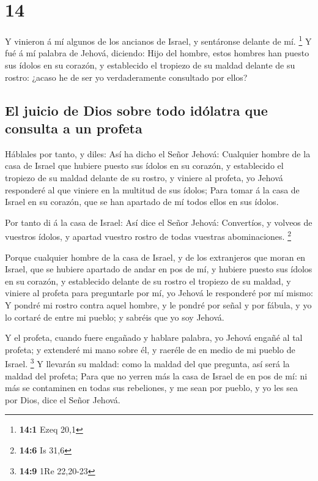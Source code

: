 \hypertarget{section-13}{%
\section{14}\label{section-13}}

 Y vinieron á mí algunos de los ancianos de Israel, y
sentáronse delante de mí. \footnote{\textbf{14:1} Ezeq 20,1}
 Y fué á mí palabra de Jehová, diciendo:  Hijo
del hombre, estos hombres han puesto sus ídolos en su corazón, y
establecido el tropiezo de su maldad delante de su rostro: ¿acaso he de
ser yo verdaderamente consultado por ellos?

\hypertarget{el-juicio-de-dios-sobre-todo-iduxf3latra-que-consulta-a-un-profeta}{%
\subsection{El juicio de Dios sobre todo idólatra que consulta a un
profeta}\label{el-juicio-de-dios-sobre-todo-iduxf3latra-que-consulta-a-un-profeta}}

 Háblales por tanto, y diles: Así ha dicho el Señor Jehová:
Cualquier hombre de la casa de Israel que hubiere puesto sus ídolos en
su corazón, y establecido el tropiezo de su maldad delante de su rostro,
y viniere al profeta, yo Jehová responderé al que viniere en la multitud
de sus ídolos;  Para tomar á la casa de Israel en su
corazón, que se han apartado de mí todos ellos en sus ídolos.

 Por tanto di á la casa de Israel: Así dice el Señor Jehová:
Convertíos, y volveos de vuestros ídolos, y apartad vuestro rostro de
todas vuestras abominaciones. \footnote{\textbf{14:6} Is 31,6}

 Porque cualquier hombre de la casa de Israel, y de los
extranjeros que moran en Israel, que se hubiere apartado de andar en pos
de mí, y hubiere puesto sus ídolos en su corazón, y establecido delante
de su rostro el tropiezo de su maldad, y viniere al profeta para
preguntarle por mí, yo Jehová le responderé por mí mismo:  Y
pondré mi rostro contra aquel hombre, y le pondré por señal y por
fábula, y yo lo cortaré de entre mi pueblo; y sabréis que yo soy Jehová.

 Y el profeta, cuando fuere engañado y hablare palabra, yo
Jehová engañé al tal profeta; y extenderé mi mano sobre él, y raeréle de
en medio de mi pueblo de Israel. \footnote{\textbf{14:9} 1Re 22,20-23}
 Y llevarán su maldad: como la maldad del que pregunta, así
será la maldad del profeta;  Para que no yerren más la casa
de Israel de en pos de mí: ni más se contaminen en todas sus rebeliones,
y me sean por pueblo, y yo les sea por Dios, dice el Señor Jehová.

